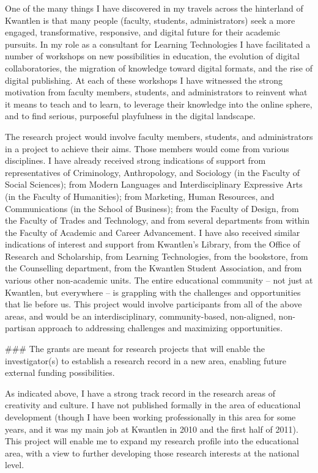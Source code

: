 One of the many things I have discovered in my travels across the hinterland of Kwantlen is that many people (faculty, students, administrators) seek a more engaged, transformative, responsive, and digital future for their academic pursuits. In my role as a consultant for Learning Technologies I have facilitated a number of workshops on new possibilities in education, the evolution of digital collaboratories, the migration of knowledge toward digital formats, and the rise of digital publishing. At each of these workshops I have witnessed the strong motivation from faculty members, students, and administrators to reinvent what it means to teach and to learn, to leverage their knowledge into the online sphere, and to find serious, purposeful playfulness in the digital landscape.

The research project would involve faculty members, students, and administrators in a project to achieve their aims. Those members would come from various disciplines. I have already received strong indications of support from representatives of Criminology, Anthropology, and Sociology (in the Faculty of Social Sciences); from Modern Languages and Interdisciplinary Expressive Arts (in the Faculty of Humanities); from Marketing, Human Resources, and Communications (in the School of Business); from the Faculty of Design, from the Faculty of Trades and Technology, and from several departments from within the Faculty of Academic and Career Advancement. I have also received similar indications of interest and support from Kwantlen's Library, from the Office of Research and Scholarship, from Learning Technologies, from the bookstore, from the Counselling department, from the Kwantlen Student Association, and from various other non-academic units. The entire educational community -- not just at Kwantlen, but everywhere -- is grappling with the challenges and opportunities that lie before us. This project would involve participants from all of the above areas, and would be an interdisciplinary, community-based, non-aligned, non-partisan approach to addressing challenges and maximizing opportunities.


### The grants are meant for research projects that will enable the investigator(s) to establish a research record in a new area, enabling future external funding possibilities.

As indicated above, I have a strong track record in the research areas of creativity and culture. I have not published formally in the area of educational development (though I have been working professionally in this area for some years, and it was my main job at Kwantlen in 2010 and the first half of 2011). This project will enable me to expand my research profile into the educational area, with a view to further developing those research interests at the national level.

